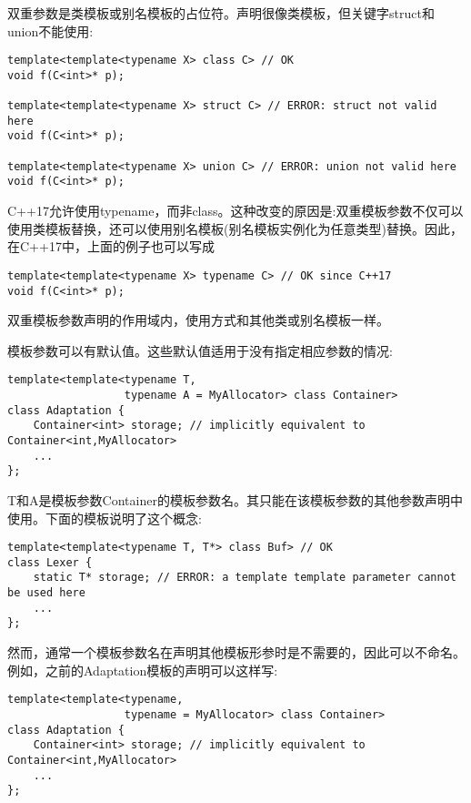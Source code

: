 双重参数是类模板或别名模板的占位符。声明很像类模板，但关键字struct和union不能使用:

\begin{lstlisting}[style=styleCXX]
template<template<typename X> class C> // OK
void f(C<int>* p);

template<template<typename X> struct C> // ERROR: struct not valid here
void f(C<int>* p);

template<template<typename X> union C> // ERROR: union not valid here
void f(C<int>* p);
\end{lstlisting}

C++17允许使用typename，而非class。这种改变的原因是:双重模板参数不仅可以使用类模板替换，还可以使用别名模板(别名模板实例化为任意类型)替换。因此，在C++17中，上面的例子也可以写成

\begin{lstlisting}[style=styleCXX]
template<template<typename X> typename C> // OK since C++17
void f(C<int>* p);
\end{lstlisting}

双重模板参数声明的作用域内，使用方式和其他类或别名模板一样。

模板参数可以有默认值。这些默认值适用于没有指定相应参数的情况:

\begin{lstlisting}[style=styleCXX]
template<template<typename T,
				  typename A = MyAllocator> class Container>
class Adaptation {
	Container<int> storage; // implicitly equivalent to Container<int,MyAllocator>
	...
};
\end{lstlisting}

T和A是模板参数Container的模板参数名。其只能在该模板参数的其他参数声明中使用。下面的模板说明了这个概念:

\begin{lstlisting}[style=styleCXX]
template<template<typename T, T*> class Buf> // OK
class Lexer {
	static T* storage; // ERROR: a template template parameter cannot be used here
	...
};
\end{lstlisting}

然而，通常一个模板参数名在声明其他模板形参时是不需要的，因此可以不命名。例如，之前的Adaptation模板的声明可以这样写:

\begin{lstlisting}[style=styleCXX]
template<template<typename,
				  typename = MyAllocator> class Container>
class Adaptation {
	Container<int> storage; // implicitly equivalent to Container<int,MyAllocator>
	...
};
\end{lstlisting}

